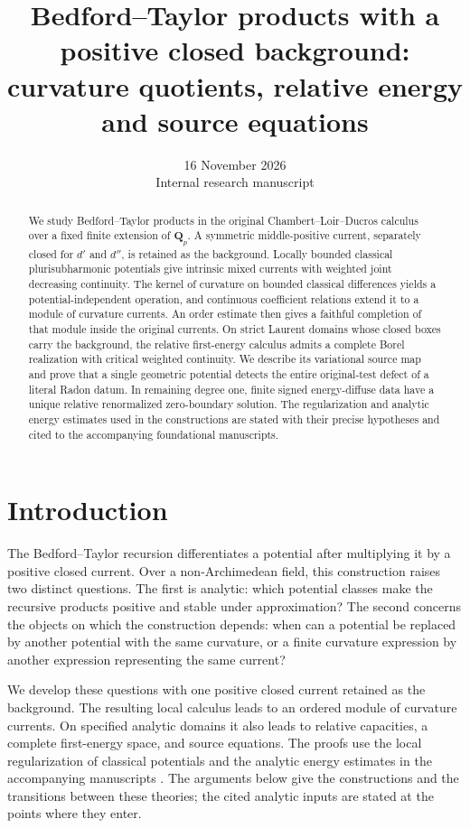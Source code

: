 \documentclass[11pt,reqno]{amsart}
\title[Bedford--Taylor products and relative energy]{Bedford--Taylor products with a positive closed background:\\curvature quotients, relative energy and source equations}
\author{}
\date{16 November 2026\\Internal research manuscript}
\theoremstyle{definition}
\theoremstyle{remark}
\numberwithin{equation}{section}
\begin{document}
\begin{abstract}
We study Bedford--Taylor products in the original Chambert--Loir--Ducros
calculus over a fixed finite extension of $\mathbf Q_p$. A symmetric
middle-positive current, separately closed for $d'$ and $d''$, is retained
as the background. Locally bounded classical plurisubharmonic potentials
give intrinsic mixed currents with weighted joint decreasing continuity.
The kernel of curvature on bounded classical differences yields a
potential-independent operation, and continuous coefficient relations
extend it to a module of curvature currents. An order estimate then gives
a faithful completion of that module inside the original currents.
On strict Laurent domains whose closed boxes carry the background, the
relative first-energy calculus admits a complete Borel realization with
critical weighted continuity. We describe its variational source map and
prove that a single geometric potential detects the entire original-test
defect of a literal Radon datum. In remaining degree one, finite signed
energy-diffuse data have a unique relative renormalized zero-boundary
solution. The regularization and analytic energy estimates used in the
constructions are stated with their precise hypotheses and cited to the
accompanying foundational manuscripts.
\end{abstract}
\maketitle
\setcounter{tocdepth}{1}
\begingroup\hypersetup{linkcolor=SectionLink}\tableofcontents\endgroup
\clearpage
\section{Introduction}\label{sec:introduction}

The Bedford--Taylor recursion differentiates a potential after multiplying
it by a positive closed current. Over a non-Archimedean field, this
construction raises two distinct questions. The first is analytic:
which potential classes make the recursive products positive and stable
under approximation? The second concerns the objects on which the
construction depends: when can a potential be replaced by another
potential with the same curvature, or a finite curvature expression by
another expression representing the same current?

We develop these questions with one positive closed current retained as
the background. The resulting local calculus leads to an ordered module
of curvature currents. On specified analytic domains it also leads to
relative capacities, a complete first-energy space, and source equations.
The proofs use the local regularization of classical potentials and the
analytic energy estimates in the accompanying manuscripts
\cite{Continuous,Bounded,Order,Energy,Dual}. The arguments below give the
constructions and the transitions between these theories; the cited
analytic inputs are stated at the points where they enter.
\end{document}
